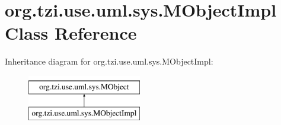 \hypertarget{classorg_1_1tzi_1_1use_1_1uml_1_1sys_1_1_m_object_impl}{\section{org.\-tzi.\-use.\-uml.\-sys.\-M\-Object\-Impl Class Reference}
\label{classorg_1_1tzi_1_1use_1_1uml_1_1sys_1_1_m_object_impl}
}
Inheritance diagram for org.\-tzi.\-use.\-uml.\-sys.\-M\-Object\-Impl\-:\begin{figure}[H]
\begin{center}
\leavevmode
\includegraphics[height=2.000000cm]{classorg_1_1tzi_1_1use_1_1uml_1_1sys_1_1_m_object_impl}
\end{center}
\end{figure}
